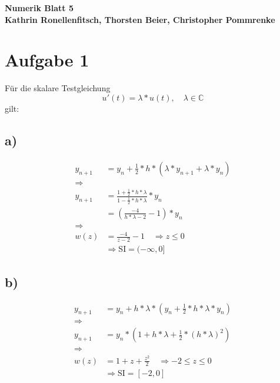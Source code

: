 \documentclass[10pt,oneside,a4paper]{scrartcl}
\begin{document}
    \begin{center}
        \huge %
        \bfseries %
        \sffamily %
        Numerik Blatt 5\\[1em]
        \normalsize
        Kathrin Ronellenfitsch, Thorsten Beier, Christopher Pommrenke
    \end{center}

    
    \section*{Aufgabe 1}
        Für die skalare Testgleichung
        \begin{equation*}
            u'(t) = \lambda * u(t), \quad \lambda \in{\mathbb{C}}
        \end{equation*}
        gilt:
        
        \subsection*{a)}
            \begin{align*}
                y_{n + 1} &= y_n + \frac{1}{2} * h * (\lambda * y_{n + 1} +
                \lambda * y_n)\\
                \Rightarrow\\
                y_{n + 1} &= \frac{1 + \frac{1}{2} * h * \lambda}{1 -
                \frac{1}{2} * h * \lambda} * y_n\\
                &= (\frac{-4}{h * \lambda - 2} - 1) * y_n\\
                \Rightarrow\\
                w(z) &= \frac{-4}{z - 2} - 1 \quad \Rightarrow z \leq 0\\
                &\Rightarrow \text{SI} = (-\infty, 0]                
            \end{align*}

        \subsection*{b)}
            \begin{align*}
                y_{n + 1} &= y_n + h * \lambda * (y_n + \frac{1}{2} * h *
                \lambda * y_n)\\
                \Rightarrow\\
                y_{n + 1} &= y_n * (1 + h * \lambda + \frac{1}{2} * (h *
                \lambda)^2)\\
                \Rightarrow\\ w(z) &= 1 + z + \frac{z^2}{2} \quad
                \Rightarrow -2 \leq z \leq 0\\ &\Rightarrow \text{SI} =
                [-2, 0]
            \end{align*}
\end{document}
